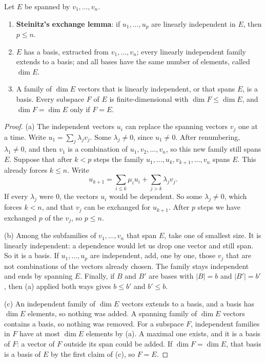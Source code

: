 \begin{theoremx}
Let $E$ be spanned by $v_1,\dots,v_n$.
\begin{enumerate}[label=(\alph*)]
\item \textbf{Steinitz's exchange lemma}: if $u_1,\dots,u_p$ are linearly independent in $E$, then $p\le n$.
\item $E$ has a basis, extracted from $v_1,\dots,v_n$; every linearly independent family extends to a basis; and all bases have the same number of elements, called $\dim E$.
\item A family of $\dim E$ vectors that is linearly independent, or that spans $E$, is a basis. Every subspace $F$ of $E$ is finite-dimensional with $\dim F\le\dim E$, and $\dim F=\dim E$ only if $F=E$.
\end{enumerate}
\end{theoremx}
\begin{proof}
(a) The independent vectors $u_i$ can replace the spanning vectors $v_j$ one at a time. Write $u_1=\sum_j\lambda_jv_j$. Some $\lambda_j\ne0$, since $u_1\ne0$. After renumbering, $\lambda_1\ne0$, and then $v_1$ is a combination of $u_1,v_2,\dots,v_n$, so this new family still spans $E$. Suppose that after $k<p$ steps the family $u_1,\dots,u_k,v_{k+1},\dots,v_n$ spans $E$. This already forces $k\le n$. Write
\[
u_{k+1}=\sum_{i\le k}\mu_iu_i+\sum_{j>k}\lambda_jv_j.
\]
If every $\lambda_j$ were $0$, the vectors $u_i$ would be dependent. So some $\lambda_j\ne0$, which forces $k<n$, and that $v_j$ can be exchanged for $u_{k+1}$. After $p$ steps we have exchanged $p$ of the $v_j$, so $p\le n$.

(b) Among the subfamilies of $v_1,\dots,v_n$ that span $E$, take one of smallest size. It is linearly independent: a dependence would let us drop one vector and still span. So it is a basis. If $u_1,\dots,u_p$ are independent, add, one by one, those $v_j$ that are not combinations of the vectors already chosen. The family stays independent and ends by spanning $E$. Finally, if $B$ and $B'$ are bases with $|B|=b$ and $|B'|=b'$, then (a) applied both ways gives $b\le b'$ and $b'\le b$.

(c) An independent family of $\dim E$ vectors extends to a basis, and a basis has $\dim E$ elements, so nothing was added. A spanning family of $\dim E$ vectors contains a basis, so nothing was removed. For a subspace $F$, independent families in $F$ have at most $\dim E$ elements by (a). A maximal one exists, and it is a basis of $F$: a vector of $F$ outside its span could be added. If $\dim F=\dim E$, that basis is a basis of $E$ by the first claim of (c), so $F=E$.
\end{proof}

